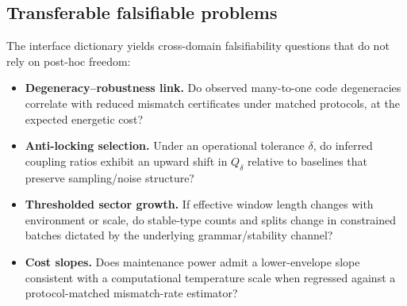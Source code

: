 \subsection{Transferable falsifiable problems}
The interface dictionary yields cross-domain falsifiability questions that do not rely on post-hoc freedom:
\begin{itemize}
  \item \textbf{Degeneracy--robustness link.} Do observed many-to-one code degeneracies correlate with reduced mismatch certificates under matched protocols, at the expected energetic cost?
  \item \textbf{Anti-locking selection.} Under an operational tolerance $\delta$, do inferred coupling ratios exhibit an upward shift in $Q_\delta$ relative to baselines that preserve sampling/noise structure?
  \item \textbf{Thresholded sector growth.} If effective window length changes with environment or scale, do stable-type counts and splits change in constrained batches dictated by the underlying grammar/stability channel?
  \item \textbf{Cost slopes.} Does maintenance power admit a lower-envelope slope consistent with a computational temperature scale when regressed against a protocol-matched mismatch-rate estimator?
\end{itemize}



